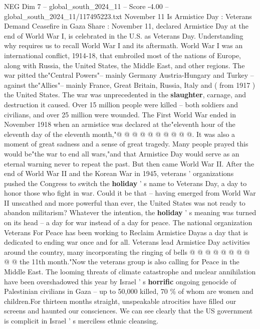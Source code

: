 \begin{textsample}{NEG Dim 7 – global\_south\_2024\_11 – Score -4.00 – global\_south\_2024\_11/117495223.txt}  \label{ex:f7_neg_439}
November 11 Is Armistice Day : Veterans Demand Ceasefire in Gaza Share : November 11, declared Armistice Day at the end of World War I, is celebrated in the U.S. as Veterans Day.
Understanding why requires us to recall World War I and its aftermath.
World War I was an international conflict, 1914-18, that embroiled most of the nations of Europe, along with Russia, the United States, the Middle East, and other regions.
The war pitted the"Central Powers"-- mainly Germany Austria-Hungary and Turkey -- against the"Allies"-- mainly France, Great Britain, Russia, Italy and ( from 1917 ) the United States.
The war was unprecedented in the \textbf{slaughter}, carnage, and destruction it caused.
Over 15 million people were killed -- both soldiers and civilians, and over 25 million were wounded.
The First World War ended in November 1918 when an armistice was declared at the"eleventh hour of the eleventh day of the eleventh month,"@ @ @ @ @ @ @ @ @ @.
It was also a moment of great sadness and a sense of great tragedy.
Many people prayed this would be"the war to end all wars,"and that Armistice Day would serve as an eternal warning never to repeat the past.
But then came World War II.
After the end of World War II and the Korean War in 1945, veterans ' organizations pushed the Congress to switch the \textbf{holiday} ' s name to Veterans Day, a day to honor those who fight in war.
Could it be that -- having emerged from World War II unscathed and more powerful than ever, the United States was not ready to abandon militarism?
Whatever the intention, the \textbf{holiday} ' s meaning was turned on its head -- a day for war instead of a day for peace.
The national organization Veterans For Peace has been working to Reclaim Armistice Dayas a day that is dedicated to ending war once and for all.
Veterans lead Armistice Day activities around the country, many incorporating the ringing of bells @ @ @ @ @ @ @ @ @ @ the 11th month."Now the veterans group is also calling for Peace in the Middle East.
The looming threats of climate catastrophe and nuclear annihilation have been overshadowed this year by Israel ' s \textbf{horrific} ongoing genocide of Palestinian civilians in Gaza -- up to 50,000 killed, 70 \% of whom are women and children.For thirteen months straight, unspeakable atrocities have filled our screens and haunted our consciences.
We can see clearly that the US government is complicit in Israel ' s merciless ethnic cleansing.

\end{textsample}
